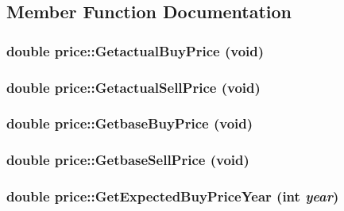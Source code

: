 \subsection{Member Function Documentation}
\hypertarget{classprice_accf6ccdd9b9233912ee97522fdd591b3}{
\subsubsection[{GetactualBuyPrice}]{\setlength{\rightskip}{0pt plus 5cm}double price::GetactualBuyPrice (void)}}
\label{classprice_accf6ccdd9b9233912ee97522fdd591b3}
\hypertarget{classprice_a15cd3b8464d303c662dee82cae26abc5}{
\subsubsection[{GetactualSellPrice}]{\setlength{\rightskip}{0pt plus 5cm}double price::GetactualSellPrice (void)}}
\label{classprice_a15cd3b8464d303c662dee82cae26abc5}
\hypertarget{classprice_a11fd350967bdb33a8594f14c02bfcdd5}{
\subsubsection[{GetbaseBuyPrice}]{\setlength{\rightskip}{0pt plus 5cm}double price::GetbaseBuyPrice (void)}}
\label{classprice_a11fd350967bdb33a8594f14c02bfcdd5}
\hypertarget{classprice_a0283d3c7b5eb0ccfc117ee456ea40119}{
\subsubsection[{GetbaseSellPrice}]{\setlength{\rightskip}{0pt plus 5cm}double price::GetbaseSellPrice (void)}}
\label{classprice_a0283d3c7b5eb0ccfc117ee456ea40119}
\hypertarget{classprice_a9bed928f8d0992ca3dd2f140985427a6}{
\subsubsection[{GetExpectedBuyPriceYear}]{\setlength{\rightskip}{0pt plus 5cm}double price::GetExpectedBuyPriceYear (int {\em year})}}
